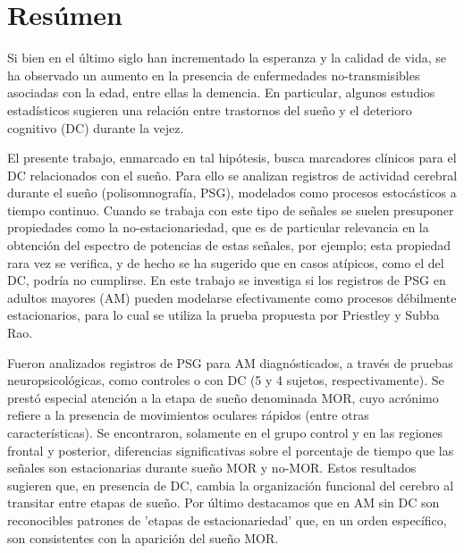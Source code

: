 \documentclass[12pt,a4paper]{mitthesis}
\begin{document}
\setcounter{page}{1}

\chapter*{Res\'umen}

{\small

Si bien en el \'ultimo siglo han incrementado la esperanza y la calidad de vida, se ha observado 
\cite{PlanAlzheimer04} un aumento en la presencia de enfermedades no-transmisibles asociadas con 
la edad, entre ellas la demencia.
En particular, algunos estudios estad\'isticos \cite{Amer13,Miyata13,Potvin12} sugieren una 
relaci\'on entre trastornos del sue\~no y el deterioro cognitivo (DC) durante la vejez.

El presente trabajo, enmarcado en tal hip\'otesis, busca marcadores cl\'inicos para el DC
relacionados con el sue\~no.
Para ello se analizan registros de actividad cerebral durante el sue\~no (polisomnograf\'ia, PSG), 
modelados como procesos estoc\'asticos a tiempo continuo. 
Cuando se trabaja con este tipo de se\~nales se suelen presuponer propiedades como la 
no-estacionariedad, que es de particular relevancia en la obtenci\'on del espectro de potencias de 
estas se\~nales, por ejemplo; esta propiedad rara vez se verifica, y de hecho se ha sugerido
\cite{McEwen75,Cohen77,Sugimoto78} que en casos at\'ipicos, como el del DC, podr\'ia no cumplirse. 
En este trabajo se investiga si los registros de PSG en adultos mayores (AM) pueden modelarse 
efectivamente como procesos d\'ebilmente estacionarios, para lo cual se utiliza la prueba propuesta 
por Priestley y Subba Rao.

Fueron analizados registros de PSG para AM diagn\'osticados, a trav\'es de pruebas 
neuropsicol\'ogicas, como controles o con DC (5 y 4 sujetos, respectivamente). 
Se prest\'o especial atenci\'on a la etapa de sue\~no denominada MOR, cuyo acr\'onimo refiere a la
presencia de movimientos oculares r\'apidos (entre otras caracter\'isticas).
Se encontraron, solamente en el grupo control y en las regiones frontal y posterior, diferencias 
significativas sobre el porcentaje de tiempo que las se\~nales son estacionarias durante sue\~no 
MOR y no-MOR.
Estos resultados sugieren que, en presencia de DC, cambia la organizaci\'on funcional del cerebro 
al transitar entre etapas de sue\~no.
Por \'ultimo destacamos que en AM sin DC son reconocibles patrones de 'etapas de estacionariedad' 
que, en un orden espec\'ifico, son consistentes con la aparici\'on del sue\~no MOR.

}
\end{document}
